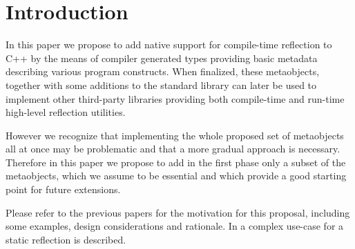 \section{Introduction}

In this paper we propose to add native support for
compile-time reflection to C++ by the means of compiler generated
types providing basic metadata describing various program constructs.
When finalized, these metaobjects, together with some additions to the standard
library can later be used to implement other third-party libraries
providing both compile-time and run-time high-level
reflection utilities.

However we recognize that implementing the whole proposed set of metaobjects
all at once may be problematic and that a more gradual approach is necessary.
Therefore in this paper we propose to add in the first phase
only a subset of the metaobjects, which we assume to be essential
and which provide a good starting point for future extensions.

Please refer to the previous papers \cite{n3996,n4111,n4451,n4452}
for the motivation for this proposal, including some examples,
design considerations and rationale. In \cite{ITFPWTHOR} a complex use-case
for a static reflection is described.

